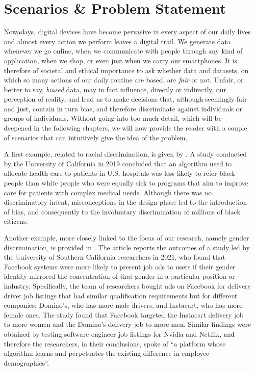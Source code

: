 \section{Scenarios \& Problem Statement}
Nowadays, digital devices have become pervasive in every aspect of our daily lives and almost every action we perform leaves a digital trail. We generate data whenever we go online, when we communicate with people through any kind of application, when we shop, or even just when we carry our smartphones. It is therefore of societal and ethical importance to ask whether data and datasets, on which so many actions of our daily routine are based, are \textit{fair} or not. Unfair, or better to say, \textit{biased} data, may in fact influence, directly or indirectly, our perception of reality, and lead us to make decisions that, although seemingly fair and just, contain in turn bias, and therefore discriminate against individuals or groups of individuals. Without going into too much detail, which will be deepened in the following chapters, we will now provide the reader with a couple of scenarios that can intuitively give the idea of the problem.

A first example, related to racial discrimination, is given by \cite{ledford2019millions}. A study conducted by the University of California in 2019 concluded that an algorithm used to allocate health care to patients in U.S. hospitals was less likely to refer black people than white people who were equally sick to programs that aim to improve care for patients with complex medical needs. Although there was no discriminatory intent, misconceptions in the design phase led to the introduction of bias, and consequently to the involuntary discrimination of millions of black citizens.

Another example, more closely linked to the focus of our research, namely gender discrimination, is provided in \cite{horwitz2021facebook}. The article reports the outcomes of a study led by the University of Southern California researchers in 2021, who found that Facebook systems were more likely to present job ads to users if their gender identity mirrored the concentration of that gender in a particular position or industry. Specifically, the team of researchers bought ads on Facebook for delivery driver job listings that had similar qualification requirements but for different companies: Domino's, who has more male drivers, and Instacart, who has more female ones. The study found that Facebook targeted the Instacart delivery job to more women and the Domino's delivery job to more men. Similar findings were obtained by testing software engineer job listings for Nvidia and Netflix, and therefore the researchers, in their conclusions, spoke of ``a platform whose algorithm learns and perpetuates the existing difference in employee demographics''.

